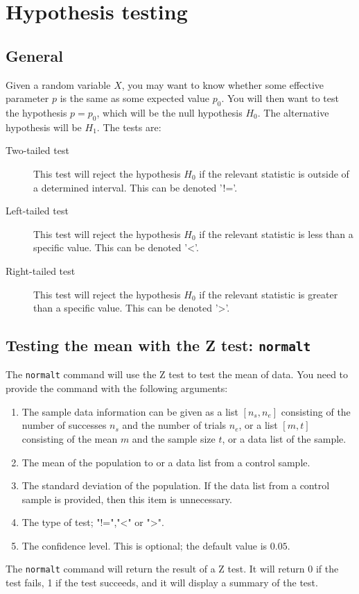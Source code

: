 \documentclass[a4paper,11pt]{book}
\begin{document}
\section{Hypothesis testing}

\subsection{General}

Given a random variable $X$, you may want to know whether some
effective parameter $p$ is the same as some expected value $p_0$.  You
will then want to test the hypothesis $p = p_0$, which will be the
null hypothesis $H_0$.  The alternative hypothesis will be $H_1$.
The tests are:
\begin{description}
   \item[Two-tailed test]  This test will reject the hypothesis $H_0$
   if the relevant statistic is outside of a determined interval.
   This can be denoted '!='.
   \item[Left-tailed test] This test will reject the hypothesis $H_0$
   if the relevant statistic is less than a specific value.
   This can be denoted '<'.
   \item[Right-tailed test] This test will reject the hypothesis $H_0$
   if the relevant statistic is greater than a specific value.
   This can be denoted '>'.
\end{description}

\subsection{Testing the mean with the Z test: \texttt{normalt}}

The \texttt{normalt} command will use the Z test to test the mean of
data.
You need to provide the command with the following arguments:
\begin{enumerate}
  \item
  The sample data information can be given as a list $[n_s,n_e]$
  consisting of the number of successes $n_s$ and the number of trials
  $n_e$, or a list $[m,t]$ consisting of the mean $m$ and the sample
  size $t$, or a data list of the sample.
  \item
  The mean of the population to or a data list from a control sample.
  \item
  The standard deviation of the population.  If the data list from a
  control sample is provided, then this item is unnecessary.
  \item
  The type of test; "!=","<" or ">".
  \item
  The confidence level.  This is optional; the default
  value is $0.05$.
\end{enumerate}
The \texttt{normalt} command will return the result of a Z test.  It
will return 0 if the test fails, 1 if the test succeeds, and it will
display a summary of the test.
\end{document}

